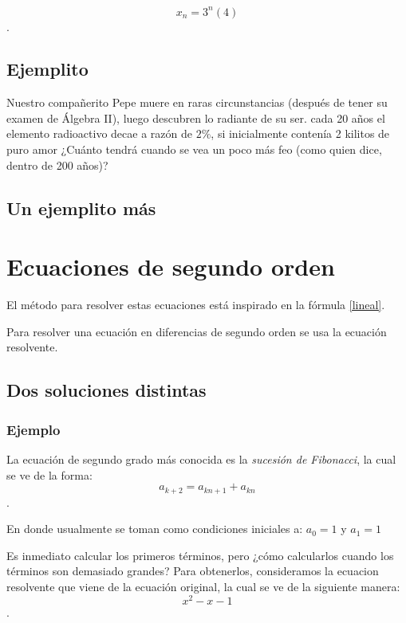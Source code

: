\documentclass{article}
\begin{document}
$$x_n=3^n(4)$$.  

\subsection{Ejemplito}

Nuestro compañerito Pepe muere en raras circunstancias (después de
tener su examen de Álgebra II), luego descubren lo radiante de su
ser. cada 20 años el elemento radioactivo decae a razón de $2\%$, si
inicialmente contenía 2 kilitos de puro amor ¿Cuánto tendrá cuando se
vea un poco más feo (como quien dice, dentro de 200 años)?

\subsection{Un ejemplito más}


\section{Ecuaciones de segundo orden}

El método para resolver estas ecuaciones está inspirado en la fórmula \ref{lineal}.

Para resolver una ecuación en diferencias de segundo orden se usa la ecuación resolvente.


\subsection{Dos soluciones distintas}
\label{sec:distintas}

\subsubsection{Ejemplo}

La ecuación de segundo grado más conocida es la \textit{sucesión de
  Fibonacci}, la cual se ve de la forma:
$$a_{k+2}=a_{kn+1}+a_{kn}$$.
 
En donde usualmente se toman como condiciones iniciales a: $a_{0}=1$ y $a_{1}=1$

Es inmediato calcular los primeros términos, pero ¿cómo calcularlos
cuando los términos son demasiado grandes?  Para obtenerlos,
consideramos la ecuacion resolvente que viene de la ecuación original,
la cual se ve de la siguiente manera:
$$x^2-x-1$$.
\end{document}
